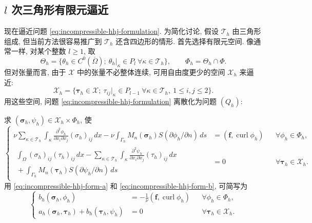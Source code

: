 \subsection{$l$ 次三角形有限元逼近}
\label{subsec:incompressible-hhj-triangular-approximation}

现在逼近问题 \eqref{eq:incompressible-hhj-formulation}.
为简化讨论, 假设 $\mathcal T_h$ 由三角形组成,
但当前方法很容易推广到 $\mathcal T_h$ 还含四边形的情形.
首先选择有限元空间. 像通常一样, 对某个整数 $l\geq1$, 取
\begin{equation}\label{eq:incompressible-hhj-stream-fe-space}
\Theta_h
=\{\theta_h\in C^0(\overline\Omega);
\ \theta_h|_\kappa\in P_l
\ \forall\kappa\in\mathcal T_h\},
\qquad
\Phi_h=\Theta_h\cap\Phi.
\end{equation}
但对张量而言, 由于 $\mathcal X$ 中的张量不必整体连续,
可用自由度更少的空间 $\mathcal X_h$ 来逼近:
\begin{equation}\label{eq:incompressible-hhj-tensor-fe-space}
\mathcal X_h
=\{\boldsymbol\tau_h\in\mathcal X;
\ \tau_{ij}|_\kappa\in P_{l-1}
\ \forall\kappa\in\mathcal T_h,
\ 1\leq i,j\leq2\}.
\end{equation}
用这些空间, 问题 \eqref{eq:incompressible-hhj-formulation}
离散化为问题 $(Q_h)$:

求 $(\boldsymbol\sigma_h,\psi_h)
\in\mathcal X_h\times\Phi_h$, 使
\begin{equation}\label{eq:incompressible-hhj-discrete-problem}
\left\{
\begin{aligned}
\nu\sum_{\kappa\in\mathcal T_h}
\int_\kappa\frac{\partial^2\phi_h}{\partial x_i\partial x_j}
(\sigma_h)_{ij}\,dx
-\nu\int_{\Gamma_h}M_n(\boldsymbol\sigma_h)
S(\partial\phi_h/\partial n)\,ds
&=(\mathbf f,\operatorname{curl}\phi_h)
&&\forall\phi_h\in\Phi_h,\\
\begin{split}
\int_\Omega(\sigma_h)_{ij}(\tau_h)_{ij}\,dx
-\sum_{\kappa\in\mathcal T_h}
\int_\kappa\frac{\partial^2\psi_h}{\partial x_i\partial x_j}
(\tau_h)_{ij}\,dx\\
{}+\int_{\Gamma_h}M_n(\boldsymbol\tau_h)
S(\partial\psi_h/\partial n)\,ds
\end{split}
&=0
&&\forall\boldsymbol\tau_h\in\mathcal X_h.
\end{aligned}
\right.
\end{equation}
用 \eqref{eq:incompressible-hhj-form-a}
和 \eqref{eq:incompressible-hhj-form-b}, 可简写为
\begin{equation}\label{eq:incompressible-hhj-discrete-abstract}
\left\{
\begin{aligned}
b_h(\boldsymbol\sigma_h,\phi_h)
&=-\frac1\nu(\mathbf f,\operatorname{curl}\phi_h)
&&\forall\phi_h\in\Phi_h,\\
a_h(\boldsymbol\sigma_h,\boldsymbol\tau_h)
+b_h(\boldsymbol\tau_h,\psi_h)&=0
&&\forall\boldsymbol\tau_h\in\mathcal X_h.
\end{aligned}
\right.
\end{equation}

